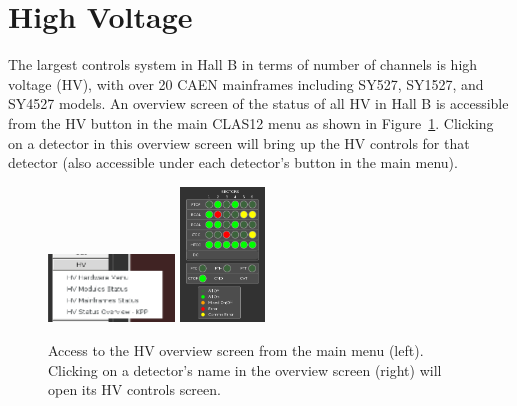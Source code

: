 \documentclass[amsmath,amssymb,notitlepage,11pt]{revtex4}
\begin{document}
\clearpage

\section{High Voltage}
The largest controls system in Hall B in terms of number of channels is high voltage (HV), with over 20 CAEN mainframes including SY527, SY1527, and SY4527 models.  An overview screen of the status of all HV in Hall B is accessible from the HV button in the main CLAS12 menu as shown in Figure~\ref{fig:hv}.  Clicking on a detector in this overview screen will bring up the HV controls for that detector (also accessible under each detector's button in the main menu).

\begin{figure}[htbp]\centering
  \includegraphics[width=0.3\textwidth]{pics/hvmenu}
  \includegraphics[width=0.2\textwidth]{pics/hvstat}
  \caption{Access to the HV overview screen from the main menu (left).  Clicking on a detector's name in the overview screen (right) will open its HV controls screen.\label{fig:hv}}
\end{figure}
\end{document}
